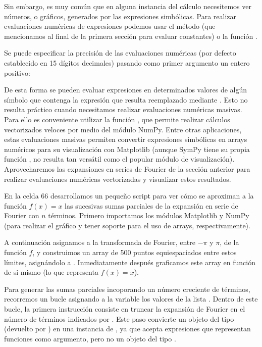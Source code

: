 Sin embargo, es muy común que en alguna instancia del cálculo necesitemos ver números, o gráficos, generados por las expresiones simbólicas. Para realizar evaluaciones numéricas de expresiones podemos usar el método  (que mencionamos al final de la primera sección para evaluar constantes) o la función .

Se puede especificar la precisión de las evaluaciones numéricas (por defecto establecido en 15 dígitos decimales) pasando como primer argumento un entero positivo:

De esta forma se pueden evaluar expresiones en determinados valores de algún símbolo que contenga la expresión que resulta reemplazado mediante . Esto no resulta práctico cuando necesitamos realizar evaluaciones numéricas masivas. Para ello es conveniente utilizar la función , que permite realizar cálculos vectorizados veloces por medio del módulo NumPy. Entre otras aplicaciones, estas evaluaciones masivas permiten convertir expresiones simbólicas en arrays numéricos para su visualización con Matplotlib (aunque SymPy tiene su propia función , no resulta tan versátil como el popular módulo de visualización). Aprovecharemos las expansiones en series de Fourier de la sección anterior para realizar evaluaciones numéricas vectorizadas y visualizar estos resultados.

En la celda 66 desarrollamos un pequeño script para ver cómo se aproximan a la función $f(x) = x$ las sucesivas sumas parciales de la expansión en serie de Fourier con $n$ términos. Primero importamos los módulos Matplotlib y NumPy (para realizar el gráfico y tener soporte para el uso de arrays, respectivamente).

    A continuación asignamos a  la transformada de Fourier, entre $-\pi$ y $\pi$, de la función $f$, y construimos un array de 500 puntos equiespaciados entre estos límites, asignándolo a . Inmediatamente después graficamos este array en función de si mismo (lo que representa $f(x) = x$).

    Para generar las sumas parciales incoporando un número creciente de términos, recorremos un bucle asignando a la variable  los valores de la lista \mip{[1, 3, 5, 7]}. Dentro de este bucle, la primera instrucción consiste en truncar la expansión de Fourier en el número de términos indicados por . Este paso convierte un objeto del tipo  (devuelto por ) en una instancia de , ya que  acepta expresiones que representan funciones como argumento, pero no un objeto del tipo . 

